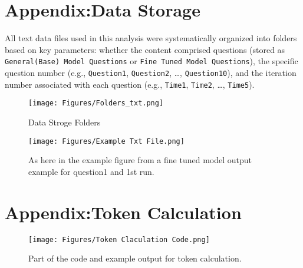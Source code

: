 \documentclass[12pt,oneside,openany]{report}
\begin{document}
\chapter{Appendix:Data Storage} 


All text data files used in this analysis were systematically organized into folders based on key parameters: whether the content comprised questions (stored as \texttt{General(Base) Model Questions} or \texttt{Fine Tuned Model Questions}), the specific question number (e.g., \texttt{Question1}, \texttt{Question2}, …, \texttt{Question10}), and the  iteration number associated with each question (e.g., \texttt{Time1}, \texttt{Time2}, …, \texttt{Time5}).


\begin{figure}[htbp]
  \centering
  \texttt{[image: Figures/Folders\_txt.png]}
  \caption{Data Stroge Folders}
  \label{fig:folders}
\end{figure}

\begin{figure}[htbp]
  \centering
  \texttt{[image: Figures/Example Txt File.png]}
  \caption{As here in the example figure from a fine tuned model output example for question1 and 1st run.}
  \label{fig:example}
\end{figure}

\chapter{Appendix:Token Calculation} 


\begin{figure}[htbp]
    \centering
    \texttt{[image: Figures/Token Claculation Code.png]}
    \caption{Part of the code and example output for token calculation.}
    \label{fig:token-calculation}
\end{figure}
\end{document}
